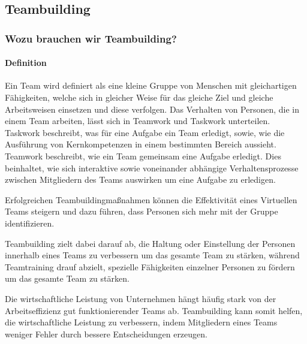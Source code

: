 \documentclass[a4paper,11pt]{article}%
\renewcommand{\\}{\vspace*{0.5\baselineskip} \newline}
\begin{document}

	
	\newpage
		\subsection{Teambuilding}		
		
		\subsubsection{Wozu brauchen wir Teambuilding?}
		\paragraph{Definition}
	Ein Team wird definiert als eine kleine Gruppe von Menschen mit gleichartigen Fähigkeiten, welche sich in gleicher Weise für das gleiche Ziel und gleiche Arbeitsweisen einsetzen und diese verfolgen.\citep[p. 2]{zenun2007effects}
	\\
Das Verhalten von Personen, die in einem Team arbeiten, lässt sich in \glqq Teamwork \grqq und \glqq Taskwork \grqq unterteilen. \citep[p. 541-542]{rousseau2006teamwork} Taskwork beschreibt, was für eine Aufgabe ein Team erledigt, sowie, wie die Ausführung von Kernkompetenzen in einem bestimmten Bereich aussieht. Teamwork beschreibt, wie ein Team gemeinsam eine Aufgabe erledigt. Dies beinhaltet, wie sich interaktive sowie voneinander abhängige Verhaltensprozesse zwischen Mitgliedern des Teams auswirken um eine Aufgabe zu erledigen. \citep[p. 357]{marks2001temporally} 
		
	Erfolgreichen Teambuildingmaßnahmen können die Effektivität eines Virtuellen Teams steigern und dazu führen, dass Personen sich mehr mit der Gruppe identifizieren. \citep{kaiser2000student}
		
	Teambuilding zielt dabei darauf ab, die Haltung oder Einstellung der Personen innerhalb eines Teams zu verbessern um das gesamte Team zu stärken, während Teamtraining drauf abzielt, spezielle Fähigkeiten einzelner Personen zu fördern um das gesamte Team zu stärken. \citep[p. 367-369]{shuffler2011there}\
		
	Die wirtschaftliche Leistung von Unternehmen hängt häufig stark von der Arbeitseffizienz gut funktionierender Teams ab. Teambuilding kann somit helfen, die wirtschaftliche Leistung zu verbessern, indem Mitgliedern eines Teams weniger Fehler durch bessere Entscheidungen erzeugen. \citep[p. 1-6]{biech2007pfeiffer} 
	
\end{document}
